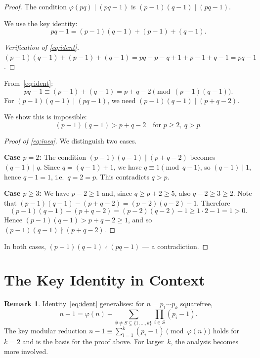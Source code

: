 \documentclass[12pt,a4paper]{amsart}
\theoremstyle{definition}
\newtheorem{remark}[theorem]{Remark}
\newcommand{\euler}{\varphi}
\begin{document}
\begin{proof}
The condition $\euler(pq) \mid (pq - 1)$ is $(p-1)(q-1) \mid (pq - 1)$.

We use the key identity:
\begin{equation}
  pq - 1 = (p-1)(q-1) + (p-1) + (q-1).
  \label{eq:ident}
\end{equation}

\begin{proof}[Verification of \eqref{eq:ident}]
$(p-1)(q-1) + (p-1) + (q-1) = pq - p - q + 1 + p - 1 + q - 1 = pq - 1$. \checkmark
\end{proof}

From~\eqref{eq:ident}:
\[
  pq - 1 \equiv (p-1) + (q-1) = p + q - 2 \pmod{(p-1)(q-1)}.
\]
For $(p-1)(q-1) \mid (pq-1)$, we need $(p-1)(q-1) \mid (p + q - 2)$.

We show this is impossible:
\begin{equation}
  (p-1)(q-1) > p + q - 2 \quad \text{for } p \ge 2,\ q > p.
  \label{eq:ineq}
\end{equation}

\begin{proof}[Proof of \eqref{eq:ineq}]
We distinguish two cases.

\textbf{Case $p = 2$:} The condition $(p-1)(q-1) \mid (p+q-2)$ becomes $(q-1) \mid q$.
Since $q = (q-1)+1$, we have $q \equiv 1 \pmod{q-1}$, so $(q-1) \mid 1$,
hence $q-1 = 1$, i.e.\ $q = 2 = p$.  This contradicts $q > p$.

\textbf{Case $p \ge 3$:} We have $p - 2 \ge 1$ and, since $q \ge p + 2 \ge 5$, also $q - 2 \ge 3 \ge 2$.
Note that $(p-1)(q-1) - (p+q-2) = (p-2)(q-2) - 1$.  Therefore
\[
  (p-1)(q-1) - (p+q-2) = (p-2)(q-2) - 1 \ge 1 \cdot 2 - 1 = 1 > 0.
\]
Hence $(p-1)(q-1) > p + q - 2 \ge 1$, and so $(p-1)(q-1) \nmid (p+q-2)$.
\end{proof}

In both cases, $(p-1)(q-1) \nmid (pq-1)$ — a contradiction.
\end{proof}

\section{The Key Identity in Context}

\begin{remark}
Identity~\eqref{eq:ident} generalises: for $n = p_1 \cdots p_k$ squarefree,
\[
  n - 1 = \varphi(n) + \sum_{\emptyset \ne S \subsetneq \{1,\ldots,k\}} \prod_{i \in S}(p_i - 1).
\]
The key modular reduction $n - 1 \equiv \sum_{i=1}^{k}(p_i - 1) \pmod{\euler(n)}$
holds for $k = 2$ and is the basis for the proof above.  For larger~$k$, the
analysis becomes more involved.
\end{remark}
\end{document}
